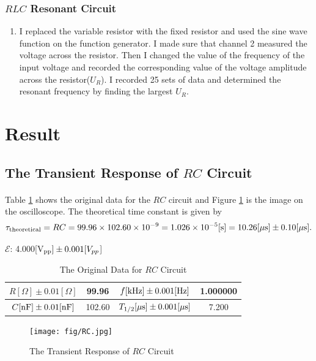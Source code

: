 \documentclass{my_template}
\newcommand{\e}{\mathcal{E}}
\begin{document}
    \subsubsection{$RLC$ Resonant Circuit}
    \begin{enumerate}
        \item I replaced the variable resistor with the fixed resistor and used the sine wave function on the function generator. I made sure that channel 2 measured the voltage across the resistor. Then I changed the value of the frequency of the input voltage and recorded the corresponding value of the voltage amplitude across the resistor($U_R$). I recorded 25 sets of data and determined the resonant frequency by finding the largest $U_R$. 
    \end{enumerate}
    \section{Result}
    \subsection{The Transient Response of $RC$ Circuit}\label{sec:RC}
    \paragraph{} Table \ref{tab:RC} shows the original data for the $RC$ circuit and Figure \ref{fig:RCresponse} is the image on the oscilloscope. The theoretical time constant is given by \[\tau_{\rm theoretical}=RC=99.96\times 102.60\times 10^{-9}=1.026\times 10^{-5}[\rm s]=10.26[\mu s]\pm 0.10[\mu s].\]
    \begin{table}[H]
        \begin{center}
            $\e$: 4.000[V$_{\rm pp}]\pm 0.001 [V_{pp}$]
            \begin{tabular}{|c|c|c|c|}
                \hline
                $R[\Omega]\pm 0.01[\Omega]$&99.96&$f[\rm kHz]\pm 0.001[Hz]$&1.000000\\\hline
                $C[\rm nF]\pm 0.01[nF]$&102.60&$T_{1/2}[\rm \mu s]\pm 0.001[\mu s]$&7.200\\\hline
            \end{tabular}
        \end{center}
        \caption{The Original Data for $RC$ Circuit}
        \label{tab:RC}
    \end{table}
    \begin{figure}[H]
        \centering
        \texttt{[image: fig/RC.jpg]}
        \caption{The Transient Response of $RC$ Circuit}
        \label{fig:RCresponse}
    \end{figure}
\end{document}
